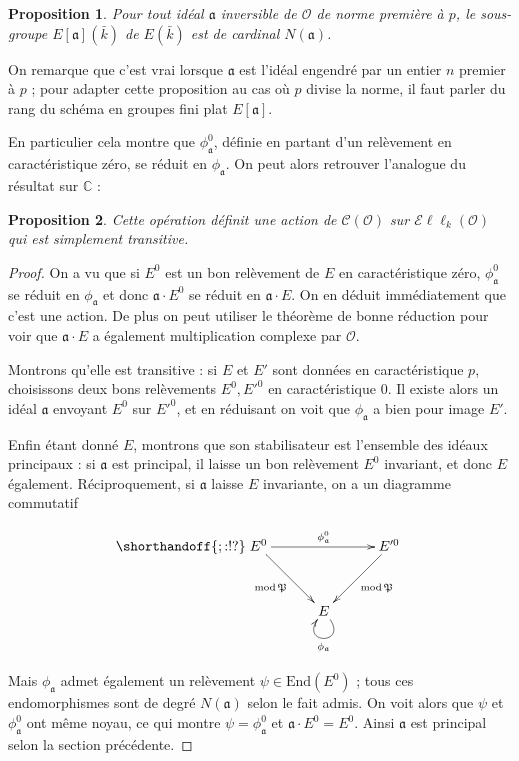 \documentclass[11pt,a4paper]{article}
\newcommand{\C}{\mathbb{C}}
\renewcommand{\O}{\mathcal{O}}
\newcommand{\Cl}{\mathcal{C}}
\newcommand{\End}{\mathrm{End}}
\newcommand{\Ell}{\mathcal{E}\ell\ell}
\renewcommand{\frak}{\mathfrak}
\newtheorem*{prop}{Proposition}
\theoremstyle{definition}
\begin{document}
\begin{prop}

Pour tout idéal $\frak a$ inversible de $\O$ de norme première à $p$, le sous-groupe $E[\frak a](\bar{k})$ de $ E(\bar{k})$ est de cardinal $N(\frak a)$.

\end{prop}

On remarque que c'est vrai lorsque $\frak a$ est l'idéal engendré par un entier $n$ premier à $p$ ; pour adapter cette proposition au cas où $p$ divise la norme, il faut parler du rang du schéma en groupes fini plat $E[\frak a]$.

En particulier cela montre que $\phi_{\frak a}^0$, définie en partant d'un relèvement en caractéristique zéro, se réduit en $\phi_{\frak a}$. On peut alors retrouver l'analogue du résultat sur $\C$ :

\begin{prop}

Cette opération définit une action de $\Cl(\O)$ sur $\Ell_k(\O)$ qui est simplement transitive.

\end{prop}

\begin{proof}

On a vu que si $E^0$ est un bon relèvement de $E$ en caractéristique zéro, $\phi_{\frak a}^0$ se réduit en $\phi_{\frak a}$ et donc $\frak a\cdot E^0$ se réduit en $\frak a\cdot E$. On en déduit immédiatement que c'est une action. De plus on peut utiliser le théorème de bonne réduction pour voir que $\frak a\cdot E$ a également multiplication complexe par $\O$.

Montrons qu'elle est transitive : si $E$ et $E'$ sont données en caractéristique $p$, choisissons deux bons relèvements $E^0, E'^0$ en caractéristique 0. Il existe alors un idéal $\frak a$ envoyant $E^0$ sur $E'^0$, et en réduisant on voit que $\phi_{\frak a}$ a bien pour image $E'$.

Enfin étant donné $E$, montrons que son stabilisateur est l'ensemble des idéaux principaux : si $\frak a$ est principal, il laisse un bon relèvement $E^0$ invariant, et donc $E$ également. Réciproquement, si $\frak a$ laisse $E$ invariante, on a un diagramme commutatif

$$
\shorthandoff{;:!?}
\xymatrix @!=8mm {
E^0 \ar[rr]^{\phi_{\frak a}^0} \ar[rd]_{\mathrm{mod}\,\frak P} & & E'^0 \ar[ld]^{\mathrm{mod}\,\frak P} \\
 & E \ar@(dr,dl)^{\phi_{\frak a}} & 
}
$$

Mais $\phi_{\frak a}$ admet également un relèvement $\psi\in \End(E^0)$ ; tous ces endomorphismes sont de degré $N(\frak a)$ selon le fait admis. On voit alors que $\psi$ et $\phi_{\frak a}^0$ ont même noyau, ce qui montre $\psi=\phi_{\frak a}^0$ et $\frak a\cdot E^0 = E^0$. Ainsi $\frak a$ est principal selon la section précédente.
\end{proof}
\end{document}
